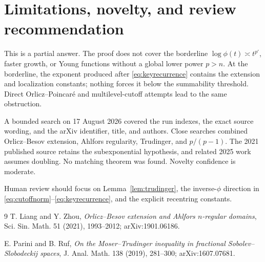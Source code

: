 \documentclass[11pt]{article}
\begin{document}
\section*{Limitations, novelty, and review recommendation}

This is a partial answer.  The proof does not cover the borderline
$\log\phi(t)\asymp t^{p'}$, faster growth, or Young functions without a global
lower power $p>n$.  At the borderline, the exponent produced after
\eqref{eq:keyrecurrence} contains the extension and localization constants;
nothing forces it below the summability threshold.  Direct Orlicz--Poincar\'e
and multilevel-cutoff attempts lead to the same obstruction.

A bounded search on 17 August 2026 covered the run indexes, the exact source
wording, and the arXiv identifier, title, and authors.  Close searches combined
Orlicz--Besov extension, Ahlfors regularity, Trudinger, and $p/(p-1)$.  The
2021 published source retains the subexponential hypothesis, and related 2025
work assumes doubling.  No matching theorem was found.  Novelty confidence is
moderate.

Human review should focus on Lemma~\ref{lem:trudinger}, the inverse-$\phi$
direction in \eqref{eq:cutoffnorm}--\eqref{eq:keyrecurrence}, and the explicit
recentring constants.

\begin{thebibliography}{9}
T. Liang and Y. Zhou,
\emph{Orlicz--Besov extension and Ahlfors $n$-regular domains},
Sci. Sin. Math. 51 (2021), 1993--2012; arXiv:1901.06186.

E. Parini and B. Ruf,
\emph{On the Moser--Trudinger inequality in fractional
Sobolev--Slobodeckij spaces},
J. Anal. Math. 138 (2019), 281--300; arXiv:1607.07681.
\end{thebibliography}
\end{document}
